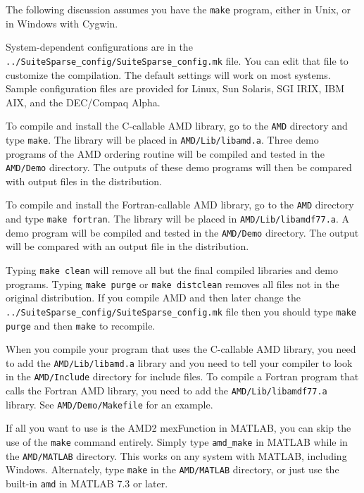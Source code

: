 \documentclass[11pt]{article}
\begin{document}
The following discussion assumes you have the {\tt make} program, either in
Unix, or in Windows with Cygwin.

System-dependent configurations are in the
{\tt ../SuiteSparse\_config/SuiteSparse\_config.mk}
file.  You can edit that file to customize the compilation.  The default
settings will work on most systems.
Sample configuration files are provided
for Linux, Sun Solaris, SGI IRIX, IBM AIX, and the DEC/Compaq Alpha.

To compile and install the C-callable AMD library,
go to the {\tt AMD} directory and type {\tt make}.
The library will be placed in {\tt AMD/Lib/libamd.a}.
Three demo programs of the AMD ordering routine will be compiled and tested in
the {\tt AMD/Demo} directory.
The outputs of these demo programs will then be compared with output
files in the distribution.

To compile and install the Fortran-callable AMD library,
go to the {\tt AMD} directory and type {\tt make fortran}.
The library will be placed in {\tt AMD/Lib/libamdf77.a}.
A demo program will be compiled and tested in the {\tt AMD/Demo} directory.
The output will be compared with an output file in the distribution.

Typing {\tt make clean} will remove all but the final compiled libraries
and demo programs.  Typing {\tt make purge} or {\tt make distclean}
removes all files not in the original distribution.
If you compile AMD and then later change the
{\tt ../SuiteSparse\_config/SuiteSparse\_config.mk} file
then you should type {\tt make purge} and then {\tt make} to recompile.

When you compile your program that uses the C-callable AMD library,
you need to add the {\tt AMD/Lib/libamd.a} library
and you need to tell your compiler to look in the
{\tt AMD/Include} directory for include
files.   To compile a Fortran program that calls the Fortran AMD library,
you need to add the {\tt AMD/Lib/libamdf77.a} library.
See {\tt AMD/Demo/Makefile} for an example.

If all you want to use is the AMD2 mexFunction in MATLAB, you can skip
the use of the {\tt make} command entirely.  Simply type
{\tt amd\_make} in MATLAB while in the {\tt AMD/MATLAB} directory.
This works on any system with MATLAB, including Windows.
Alternately, type {\tt make} in the {\tt AMD/MATLAB} directory,
or just use the built-in {\tt amd} in MATLAB 7.3 or later.
\end{document}
